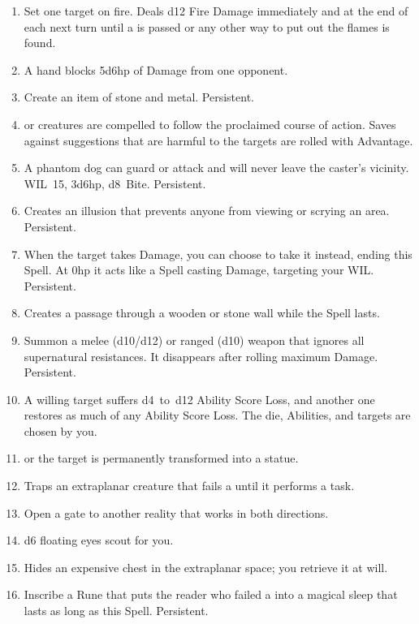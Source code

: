 \documentclass[itdr/core]{subfiles}
\begin{document}
\begin{enumerate}
	\item {} Set one target on fire. Deals d12 Fire Damage immediately and at the end of each next turn until a  is passed or any other way to put out the flames is found.
	\item {} A hand blocks 5d6hp of Damage from one opponent.
	\item {} Create an item of stone and metal. Persistent.
	\item {}  or creatures are compelled to follow the proclaimed course of action. Saves against suggestions that are harmful to the targets are rolled with Advantage.
	\item {} A phantom dog can guard or attack and will never leave the caster's vicinity. WIL~15, 3d6hp, d8~Bite. Persistent.
	\item {} Creates an illusion that prevents anyone from viewing or scrying an area. Persistent.
	\item {} When the target takes Damage, you can choose to take it instead, ending this Spell. At 0hp it acts like a Spell casting Damage, targeting your WIL. Persistent.
	\item {} Creates a passage through a wooden or stone wall while the Spell lasts.
	\item {} Summon a melee (d10/d12) or ranged (d10) weapon that ignores all supernatural resistances. It disappears after rolling maximum Damage. Persistent.
	\item {} A willing target suffers \mbox{d4 to d12} Ability Score Loss, and another one restores as much of any Ability Score Loss. The die, \mbox{Abilities}, and targets are chosen by you.
	\item {}  or the target is permanently transformed into a statue.
	\item {} Traps an extraplanar creature that fails a  until it performs a task.
	\item {} Open a gate to another reality that works in both directions.
	\item {} d6 floating eyes scout for you.
	\item {} Hides an expensive chest in the extraplanar space; you retrieve it at will.
	\item {} Inscribe a Rune that puts the reader who failed a  into a magical sleep that lasts as long as this Spell. Persistent.

\end{enumerate}
\end{document}
